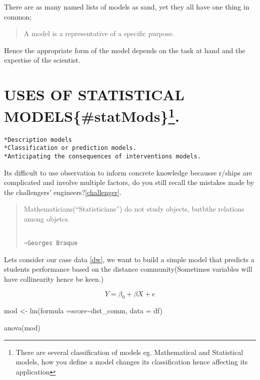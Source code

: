 \documentclass[
]{book}
\newenvironment{Shaded}{\begin{snugshade}}{\end{snugshade}}
\newcommand{\AttributeTok}[1]{\textcolor[rgb]{0.77,0.63,0.00}{#1}}
\newcommand{\FunctionTok}[1]{\textcolor[rgb]{0.00,0.00,0.00}{#1}}
\newcommand{\NormalTok}[1]{#1}
\newcommand{\OtherTok}[1]{\textcolor[rgb]{0.56,0.35,0.01}{#1}}
\newcommand{\SpecialCharTok}[1]{\textcolor[rgb]{0.00,0.00,0.00}{#1}}
\begin{document}
There are as many named lists of models as sand, yet they all have one thing in common;

\begin{quote}
A model is a representative of a specific purpose.
\end{quote}

Hence the appropriate form of the model depends on the task at hand and the expertise of the scientist.

\hypertarget{uses-of-statistical-modelsstatmods.}{%
\section[USES OF STATISTICAL MODELS\{\#statMods\}.]{\texorpdfstring{USES OF STATISTICAL MODELS\{\#statMods\}\footnote{There are several classification of models eg. Mathematical and Statistical models, how you define a model changes its classification hence affecting its application}.}{USES OF STATISTICAL MODELS\{\#statMods\}.}}\label{uses-of-statistical-modelsstatmods.}}

\begin{verbatim}
*Description models
*Classification or prediction models.
*Anticipating the consequences of interventions models.
\end{verbatim}

Its difficult to use observation to inform concrete knowledge becausse r/ships are complicated and involve multiple factors, do you still recall the mistakes made by the challengers' engineers?\ref{challenger}.

\begin{quote}
Mathematicians(``Statisticians'') do not study objects, butbthe relations among objetcs.

\begin{verbatim}
                                                         ~Georges Braque
\end{verbatim}
\end{quote}

Lets consider our case data \ref{dw}, we want to build a simple model that predicts a students performance based on the distance community(Sometimes variables will have collinearity hence be keen.)

\[
Y=\beta_0+\beta X +e
\]

\begin{Shaded}
\begin{Highlighting}[]
\NormalTok{mod }\OtherTok{\textless{}{-}} \FunctionTok{lm}\NormalTok{(}\AttributeTok{formula =}\NormalTok{score}\SpecialCharTok{\textasciitilde{}}\NormalTok{dist\_comm, }\AttributeTok{data =}\NormalTok{ df)}

\FunctionTok{anova}\NormalTok{(mod)}
\end{Highlighting}
\end{Shaded}
\end{document}
